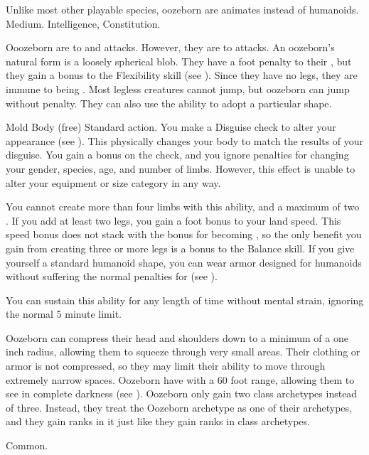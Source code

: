    Unlike most other playable species, oozeborn are animates instead of humanoids.
   Medium.
    Intelligence,  Constitution.
  \begin{itemize}
     Ooozeborn are  to \atAcid and \atPoison attacks. However, they are  to \atEarth attacks.
     An oozeborn's natural form is a loosely spherical blob.
      They have a  foot penalty to their , but they gain a  bonus to the Flexibility skill (see ).
      Since they have no legs, they are immune to being \prone.
      Most legless creatures cannot jump, but oozeborn can jump without penalty.
      They can also use the  ability to adopt a particular shape.
      \begin{sustainability}{Mold Body}{ (free)}
        \abilityusagetime Standard action.
        \rankline
        You make a Disguise check to alter your appearance (see ).
        This physically changes your body to match the results of your disguise.
        You gain a  bonus on the check, and you ignore penalties for changing your gender, species, age, and number of limbs.
        However, this effect is unable to alter your equipment or size category in any way.

        You cannot create more than four limbs with this ability, and a maximum of two .
        If you add at least two legs, you gain a  foot bonus to your land speed.
        This speed bonus does not stack with the bonus for becoming , so the only benefit you gain from creating three or more legs is a  bonus to the Balance skill.
        If you give yourself a standard humanoid shape, you can wear armor designed for humanoids without suffering the normal penalties for  (see ).

        You can sustain this ability for any length of time without mental strain, ignoring the normal 5 minute limit.
      \end{sustainability}
     Oozeborn can compress their head and shoulders down to a minimum of a one inch radius, allowing them to squeeze through very small areas.
      Their clothing or armor is not compressed, so they may limit their ability to move through extremely narrow spaces.
     Oozeborn have  with a 60 foot range, allowing them to see in complete darkness (see ).
     Oozeborn only gain two class archetypes instead of three.
      Instead, they treat the Oozeborn archetype as one of their archetypes, and they gain ranks in it just like they gain ranks in class archetypes.
  \end{itemize}
   Common.

